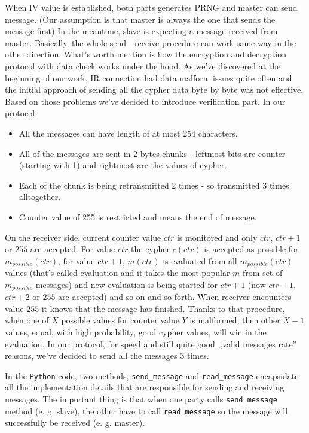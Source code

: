 
When IV value is established, both parts generates PRNG and master can send message. (Our assumption is that master is always the one that sends the message first) In the meantime, slave is expecting a message received from master. Basically, the whole send - receive procedure can work same way in the other direction. What's worth mention is how the encryption and decryption protocol with data check works under the hood. As we've discovered at the beginning of our work, IR connection had data malform issues quite often and the initial approach of sending all the cypher data byte by byte was not effective. Based on those problems we've decided to introduce verification part. In our protocol: 
\begin{itemize}
  \item {All the messages can have length of at most 254 characters.}
  \item {All of the messages are sent in 2 bytes chunks - leftmost bits are counter (starting with 1) and rightmost are the values of cypher.}
  \item {Each of the chunk is being retransmitted 2 times - so transmitted 3 times alltogether. }
  \item { Counter value of 255 is restricted and means the end of message.}
\end{itemize}
On the receiver side, current counter value $ctr$ is monitored and only $ctr$, $ctr+1$ or $255$ are accepted. For value $ctr$ the cypher $c(ctr)$ is accepted as possible for $m_{possible}(ctr)$, for value $ctr+1$, $m(ctr)$ is evaluated from all $m_{possible}(ctr)$ values (that's called evaluation and it takes the most popular $m$ from set of $m_{possible}$ messages) and new evaluation is being started for $ctr+1$ (now $ctr+1$, $ctr+2$ or $255$ are accepted) and so on and so forth. When receiver encounters value $255$ it knows that the message has finished. Thanks to that procedure, when one of $X$ possible values for counter value $Y$ is malformed, then other $X - 1$ values, equal, with high probability, good cypher values, will win in the evaluation. In our protocol, for speed and still quite good ,,valid messages rate'' reasons, we've decided to send all the messages 3 times.

In the \texttt{Python} code, two methods, \texttt{send\_message} and
 \texttt{read\_message} encapsulate all the implementation details that are responsible for sending and receiving messages. The important thing is that when one party calls \texttt{send\_message} method (e. g. slave), the other have to call \texttt{read\_message} so the message will successfully be received (e. g. master).

